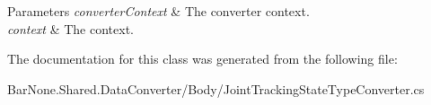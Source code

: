 \begin{DoxyParams}{Parameters}
{\em converter\+Context} & The converter context.\\
\hline
{\em context} & The context.\\
\hline
\end{DoxyParams}


The documentation for this class was generated from the following file\+:\begin{DoxyCompactItemize}
\item 
Bar\+None.\+Shared.\+Data\+Converter/\+Body/Joint\+Tracking\+State\+Type\+Converter.\+cs\end{DoxyCompactItemize}
